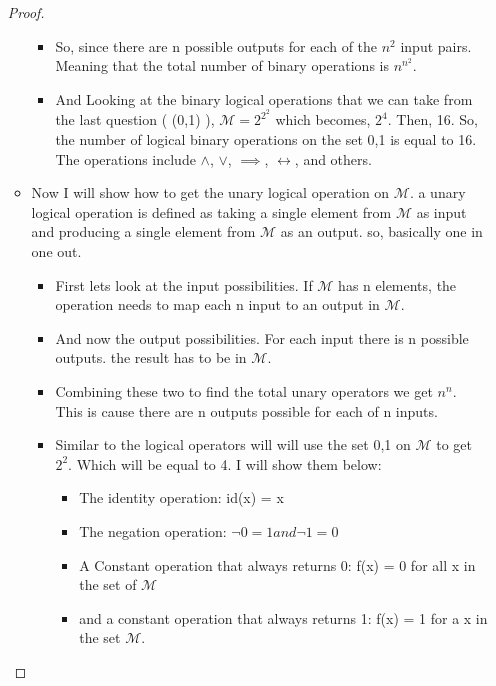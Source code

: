 \documentclass[10pt, AMS Euler]{article}
\begin{document}
\begin{enumerate}
\begin{proof}
\begin{itemize}
\begin{itemize}
                        \item So, since there are n possible outputs for each of the $n^{2}$ input pairs. Meaning that the total number of binary operations is $n^{n^{2}}$.
                        \item And Looking at the binary logical operations that we can take from the last question ( (0,1) ), $\mathcal{M} = 2^{2^{2}}$ which becomes, $2^{4}$. Then, 16. So, the number of logical binary operations on the set {0,1} is equal to 16. The operations include $\wedge$, $\vee$, $\implies$, $\longleftrightarrow$, and others. 
                    \end{itemize}
                    \item Now I will show how to get the unary logical operation on $\mathcal{M}$. a unary logical operation is defined as taking a single element from $\mathcal{M}$ as input and producing a single element from $\mathcal{M}$ as an output. so, basically one in one out. 
                        \begin{itemize}
                            \item First lets look at the input possibilities. If $\mathcal{M}$ has n elements, the operation needs to map each n input to an output in $\mathcal{M}$.
                            \item And now the output possibilities. For each input there is n possible outputs. the result has to be in $\mathcal{M}$.
                            \item Combining these two to find the total unary operators we get $n^{n}$. This is cause there are n outputs possible for each of n inputs. 
                            \item Similar to the logical operators will will use the set {0,1} on $\mathcal{M}$ to get $2^{2}$. Which will be equal to 4. I will show them below:
                            \begin{itemize}
                                \item The identity operation: id(x) = x
                                \item The negation operation: $\neg 0 = 1 and \neg 1 = 0$
                                \item A Constant operation that always returns 0: f(x) = 0 for all x in the set of $\mathcal{M}$
                                \item and a constant operation that always returns 1: f(x) = 1 for a x in the set $\mathcal{M}$.
                            \end{itemize}

\end{itemize}
\end{itemize}
\end{proof}
\end{enumerate}
\end{document}

